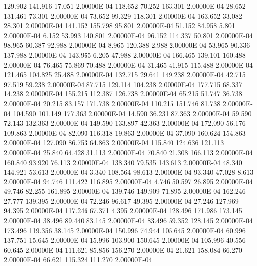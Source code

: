    129.902   141.916    17.051  2.00000E-04
   118.652    70.252   163.301  2.00000E-04
    28.652   131.461    73.301  2.00000E-04
    73.652    99.329   118.301  2.00000E-04
   163.652    33.082    28.301  2.00000E-04
   141.152   155.798    95.801  2.00000E-04
    51.152    84.958     5.801  2.00000E-04
     6.152    53.993   140.801  2.00000E-04
    96.152   114.337    50.801  2.00000E-04
    98.965    60.387    92.988  2.00000E-04
     8.965   120.388     2.988  2.00000E-04
    53.965    90.336   137.988  2.00000E-04
   143.965     6.205    47.988  2.00000E-04
   166.465   139.101   160.488  2.00000E-04
    76.465    75.869    70.488  2.00000E-04
    31.465    41.915   115.488  2.00000E-04
   121.465   104.825    25.488  2.00000E-04
   132.715    29.641   149.238  2.00000E-04
    42.715    97.519    59.238  2.00000E-04
    87.715   129.114   104.238  2.00000E-04
   177.715    68.337    14.238  2.00000E-04
   155.215   112.387   126.738  2.00000E-04
    65.215    51.747    36.738  2.00000E-04
    20.215    83.157   171.738  2.00000E-04
   110.215   151.746    81.738  2.00000E-04
   104.590   101.149   177.363  2.00000E-04
    14.590    36.231    87.363  2.00000E-04
    59.590    72.143   132.363  2.00000E-04
   149.590   133.897    42.363  2.00000E-04
   172.090    56.176   109.863  2.00000E-04
    82.090   116.318    19.863  2.00000E-04
    37.090   160.624   154.863  2.00000E-04
   127.090    86.753    64.863  2.00000E-04
   115.840   124.636   121.113  2.00000E-04
    25.840    64.428    31.113  2.00000E-04
    70.840    21.308   166.113  2.00000E-04
   160.840    93.920    76.113  2.00000E-04
   138.340    79.535   143.613  2.00000E-04
    48.340   144.921    53.613  2.00000E-04
     3.340   108.564    98.613  2.00000E-04
    93.340    47.028     8.613  2.00000E-04
    94.746   111.422   116.895  2.00000E-04
     4.746    50.597    26.895  2.00000E-04
    49.746    82.255   161.895  2.00000E-04
   139.746   149.909    71.895  2.00000E-04
   162.246    27.777   139.395  2.00000E-04
    72.246    96.617    49.395  2.00000E-04
    27.246   127.969    94.395  2.00000E-04
   117.246    67.371     4.395  2.00000E-04
   128.496   171.986   173.145  2.00000E-04
    38.496    89.440    83.145  2.00000E-04
    83.496    59.352   128.145  2.00000E-04
   173.496   119.356    38.145  2.00000E-04
   150.996    74.944   105.645  2.00000E-04
    60.996   137.751    15.645  2.00000E-04
    15.996   103.900   150.645  2.00000E-04
   105.996    40.556    60.645  2.00000E-04
   111.621    85.856   156.270  2.00000E-04
    21.621   158.084    66.270  2.00000E-04
    66.621   115.324   111.270  2.00000E-04
